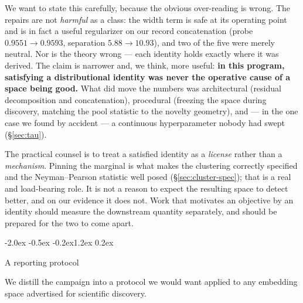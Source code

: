 \documentclass{article}
\makeatletter
\renewcommand\section{\@startsection{section}{1}{\z@}%
  {-2.0ex \@plus -0.5ex \@minus -0.2ex}{1.2ex \@plus 0.2ex}%
  {\large\bf\raggedright}}
\makeatother
\begin{document}
We want to state this carefully, because the obvious over-reading is wrong.
The repairs are not \emph{harmful} as a class: the width term is safe at its
operating point and is in fact a useful regularizer on our record concatenation
(probe $0.9551\to0.9593$, separation $5.88\to10.93$), and two of the five were
merely neutral. Nor is the theory wrong --- each identity holds exactly where it
was derived. The claim is narrower and, we think, more useful: \textbf{in this
program, satisfying a distributional identity was never the operative cause of
a space being good.} What did move the numbers was architectural (residual
decomposition and concatenation), procedural (freezing the space during
discovery, matching the pool statistic to the novelty geometry), and --- in the
one case we found by accident --- a continuous hyperparameter nobody had swept
(\S\ref{sec:tau}).

The practical counsel is to treat a satisfied identity as a \emph{license}
rather than a \emph{mechanism}. Pinning the marginal is what makes the
clustering correctly specified and the Neyman--Pearson statistic well posed
(\S\ref{sec:cluster-spec}); that is a real and load-bearing role. It is not a
reason to expect the resulting space to detect better, and on our evidence it
does not. Work that motivates an objective by an identity should measure the
downstream quantity separately, and should be prepared for the two to come
apart.

\section{A reporting protocol}

We distill the campaign into a protocol we would want applied to any embedding
space advertised for scientific discovery.
\end{document}
